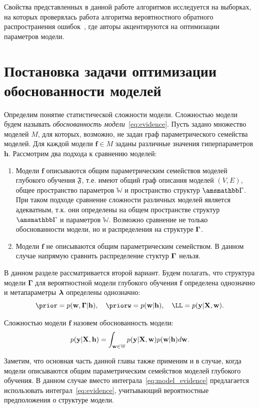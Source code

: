 Свойства представленных в данной работе  алгоритмов исследуется на выборках, на которых проверялась работа алгоритма вероятностного обратного распространения ошибок~\cite{pbp}, где авторы акцентируются на оптимизации параметров модели. 


\section{Постановка задачи оптимизации обоснованности моделей}
Определим понятие статистической сложности модели. Сложностью модели будем называть \textit{обоснованность модели}~\eqref{eq:evidence}.
Пусть задано множество моделей $M$, для которых, возможно, не задан граф параметрического семейства моделей.
Для каждой модели $\mathbf{f} \in {M}$ заданы различные значения гиперпараметров $\mathbf{h}$. 
Рассмотрим два подхода к сравнению моделей:
\begin{enumerate}
\item Модели $\mathbf{f}$ описываются общим параметрическим семействов моделей глубокого обучения $\mathfrak{F}$, т.е. имеют общий граф описания моделей $(V,E)$, общее пространство параметров $\mathbb{W}$ и пространство структур $\Gb$. При таком подходе сравнение сложности различных моделей является  адекватным, т.к. они определены на общем пространстве структур $\Gb$ и параметров $\mathbb{W}$. Возможно сравнение не только обоснованности модели, но и распределения на структуре $\boldsymbol{\Gamma}$.  
\item Модели $\mathbf{f}$  не описываются общим параметрическим семейством. В данном случае напрямую сравнить распределение стуктур $\boldsymbol{\Gamma}$ нельзя.
\end{enumerate}
В данном разделе рассматривается второй вариант. Будем полагать, что структура модели $\boldsymbol{\Gamma}$ для вероятностной модели глубокого обучения $\mathbf{f}$ определена однозначно и метапараметры $\boldsymbol{\lambda}$ определены однозначно:
\[
    \prior = p(\w,\G|\h), \quad \priorw = p(\w|\h),\quad    \LL = p(\y|\X,\w).
\]

\begin{defin} Сложностью модели $\mathbf{f}$ назовем обоснованность модели:
\begin{equation}
\label{eq:model_evidence}
	p(\mathbf{y}|\mathbf{X},\mathbf{h}) = \int_{\mathbf{w} \in \mathbb{W}} p(\mathbf{y}|\mathbf{X},\mathbf{w})p(\mathbf{w}|\mathbf{h})d\mathbf{w}.
\end{equation}
\end{defin}

Заметим, что основная часть данной главы также применим и в случае, когда модели описываются общим параметрическим семействов моделей глубокого обучения. В данном случае вместо интеграла~\eqref{eq:model_evidence} предлагается использовать интеграл~\eqref{eq:evidence}, учитывающий вероятностные предположения о структуре модели.


